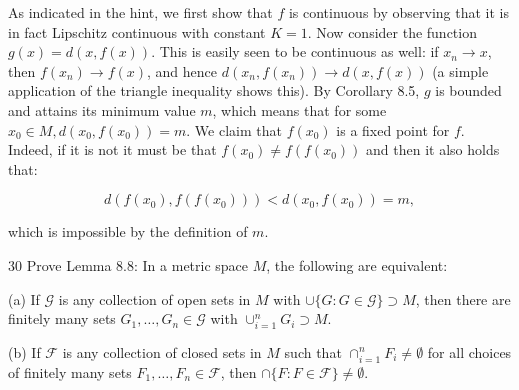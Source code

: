 \begin{solution}
    
    As indicated in the hint, we first show that $f$ is continuous by observing that it is in fact Lipschitz continuous with constant $K = 1$.
    Now consider the function $g(x) = d(x, f(x))$.
    This is easily seen to be continuous as well: if $x_n \rightarrow x$, then $f(x_n) \rightarrow f(x)$, and hence $d(x_n, f(x_n)) \rightarrow d(x, f(x))$ (a simple application of the triangle inequality shows this).
    By Corollary 8.5, $g$ is bounded and attains its minimum value $m$, which means that for some $x_0 \in M, d(x_0, f(x_0)) = m$.
    We claim that $f(x_0)$ is a fixed point for $f$.
    Indeed, if it is not it must be that $f(x_0) \neq f(f(x_0))$ and then it also holds that:

    \[d(f(x_0), f(f(x_0))) < d(x_0, f(x_0)) = m,\]

    which is impossible by the definition of $m$.

\end{solution}

\begin{exercise}{30}
    Prove Lemma 8.8: In a metric space $M$, the following are equivalent:

    (a) If $\mathcal{G}$ is any collection of open sets in $M$ with $\cup\{G: G \in \mathcal{G}\} \supset M$, then there are finitely many sets $G_1, \ldots, G_n \in \mathcal{G}$ with $\cup_{i=1}^{n} G_i \supset M$.

    (b) If $\mathcal{F}$ is any collection of closed sets in $M$ such that $\cap_{i=1}^{n} F_i \neq \emptyset$ for all choices of finitely many sets $F_1, \ldots, F_n \in \mathcal{F}$, then $\cap \{F: F \in \mathcal{F}\} \neq \emptyset$.
\end{exercise}

